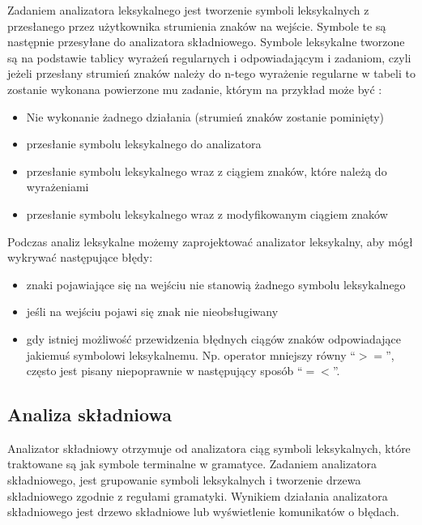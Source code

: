 Zadaniem analizatora leksykalnego jest tworzenie symboli leksykalnych 
z przesłanego przez użytkownika strumienia znaków na wejście. 
Symbole te są następnie przesyłane  do analizatora składniowego. 
Symbole leksykalne tworzone są na podstawie tablicy wyrażeń regularnych i odpowiadającym i zadaniom,
czyli jeżeli przesłany strumień znaków należy do  n-tego wyrażenie regularne w tabeli 
 to zostanie wykonana powierzone mu zadanie, 
 którym na przykład
 może być \cite{aho}:
\begin{itemize}
 \item Nie wykonanie żadnego działania (strumień znaków zostanie pominięty)
 \item przesłanie symbolu leksykalnego do analizatora
 \item przesłanie symbolu leksykalnego wraz z ciągiem znaków, które należą do wyrażeniami
 \item przesłanie symbolu leksykalnego wraz z modyfikowanym ciągiem znaków
\end{itemize}

Podczas analiz leksykalne możemy zaprojektować analizator leksykalny, 
aby mógł wykrywać następujące błędy:
      \begin{itemize}
	\item   znaki pojawiające się na wejściu nie stanowią żadnego symbolu leksykalnego
	\item   jeśli na wejściu pojawi się znak nie nieobsługiwany 
	\item   gdy istniej możliwość przewidzenia błędnych ciągów znaków odpowiadające jakiemuś symbolowi leksykalnemu.
		Np. operator mniejszy równy \textquotedblleft$>=$\textquotedblright, 
		często jest pisany niepoprawnie w następujący sposób \textquotedblleft$=<$\textquotedblright.
		
		
      \end{itemize}

\subsection{Analiza składniowa} \label{p_skladniowa}


Analizator składniowy otrzymuje od analizatora ciąg symboli leksykalnych,
 które traktowane są jak symbole terminalne w gramatyce. Zadaniem analizatora składniowego,
 jest grupowanie symboli leksykalnych i tworzenie drzewa składniowego zgodnie
 z regułami gramatyki. 
Wynikiem działania analizatora składniowego jest drzewo składniowe lub wyświetlenie komunikatów o błędach.

